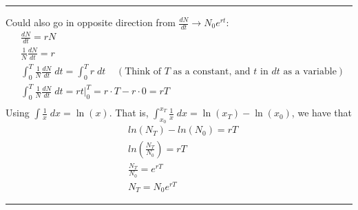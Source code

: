 \documentclass{article}
\newcommand*\circled[1]{\tikz[baseline=(char.base)]{
            \node[shape=circle,draw,inner sep=2pt] (char) {#1};}}
\begin{document}
\rule[0.5ex]{\linewidth}{1pt}

\circled{4}
Could also go in opposite direction from $\frac{dN}{dt} \rightarrow N_0 e^{rt}$:
\begin{align*}
	&	\frac{dN}{dt}=rN\\
	&	\frac{1}{N}\frac{dN}{dt}=r\\
	&	\int_0^T \frac{1}{N}\frac{dN}{dt} \; dt = \int_0^T r\; dt \;\;\;\;(\text{Think of }T \text{ as a constant, 
		and }t\text{ in }dt\text{ as a variable})\\
	&	\int_0^T \frac{1}{N}\frac{dN}{dt} \; dt = r t \vert_0^T = r \cdot T - r \cdot 0 = r T\\
\end{align*}
Using $\int \frac{1}{x}\; dx = \ln(x)$.  That is,  $\int_{x_0}^{x_T} \frac{1}{x}\; dx = \ln(x_T)-\ln(x_0)$, we 
have that
\begin{align*}
	&	ln(N_T)-ln(N_0)=rT\\
	& ln\left( \frac{N_T}{N_0}\right) = rT\\
	& \frac{N_T}{N_0}= e^{rT}\\
	& N_T=N_0e^{rT}
\end{align*}


\rule[0.5ex]{\linewidth}{1pt}
\end{document}
